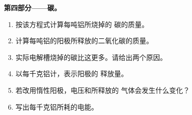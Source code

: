 \begin{problem}
\medskip
\noindent\textbf{第四部分——碳。}
\begin{enumerate}[resume]
  \item 按该方程式计算每吨铝所烧掉的
        碳的质量。
  \item 计算每吨铝的阳极所释放的二氧化碳的质量。
  \item 实际电解槽烧掉的碳比这更多。请给出两个原因。
  \item 以每千克铝计，表示阳极的  释放量。
  \item 若改用惰性阳极，电压和所释放的
        气体会发生什么变化？
  \item 写出每千克铝所耗的电能。
\end{enumerate}
\end{problem}
